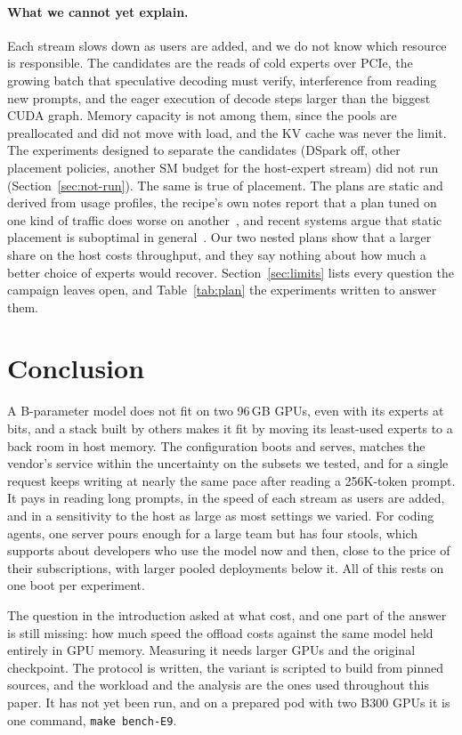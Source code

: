 \paragraph{What we cannot yet explain.}
Each stream slows down as users are added, and we do not know which resource is responsible. The candidates are the
reads of cold experts over PCIe, the growing batch that speculative decoding must verify, interference from reading
new prompts, and the eager execution of decode steps larger than the biggest CUDA graph. Memory capacity is not among
them, since the pools are preallocated and did not move with load, and the KV cache was never the limit. The
experiments designed to separate the candidates (DSpark off, other placement policies, another SM budget for the
host-expert stream) did not run (Section~\ref{sec:not-run}). The same is true of placement. The plans are static and
derived from usage profiles, the recipe's own notes report that a plan tuned on one kind of traffic does worse on
another~\citep{diffbot2026dsv41exl3}, and recent systems argue that static placement is suboptimal in
general~\citep{he2026expertflow,zhong2025hybrimoe,zhu2026dali}. Our two nested plans show that a larger share on the
host costs throughput, and they say nothing about how much a better choice of experts would recover.
Section~\ref{sec:limits} lists every question the campaign leaves open, and Table~\ref{tab:plan} the experiments
written to answer them.

\section{Conclusion}\label{sec:conclusion}

A B-parameter model does not fit on two 96\,GB GPUs, even with its experts at
 bits, and a stack built by others makes it fit by moving its least-used experts to a back room in
host memory. The configuration boots and serves, matches the vendor's service within the uncertainty on the subsets we
tested, and for a single request keeps writing at nearly the same pace after reading a 256K-token prompt. It pays in
reading long prompts, in the speed of each stream as users are added, and in a sensitivity to the host as large as
most settings we varied. For coding agents, one server pours enough for a large team but has four stools, which
supports about  developers who use the model now and then, close to the price of
their subscriptions, with larger pooled deployments below it. All of this rests on one boot per experiment.

The question in the introduction asked at what cost, and one part of the answer is still missing: how much speed the
offload costs against the same model held entirely in GPU memory. Measuring it needs larger GPUs and the original
checkpoint. The protocol is written, the variant is scripted to build from pinned sources, and the workload and the
analysis are the ones used throughout this paper. It has not yet been run, and on a prepared pod with two B300 GPUs
it is one command, \texttt{make bench-E9}.
